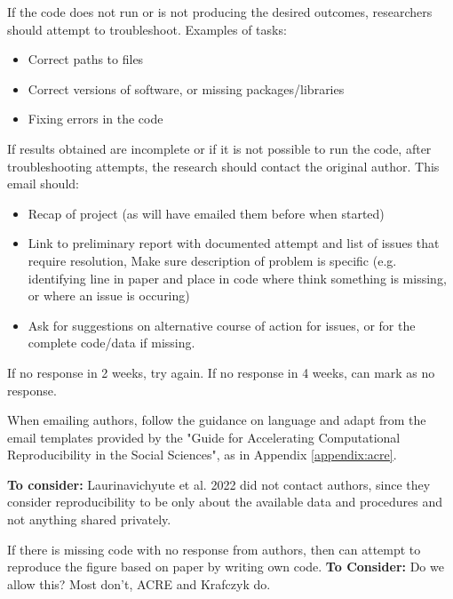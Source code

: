 If the code does not run or is not producing the desired outcomes, researchers should attempt to troubleshoot. Examples of tasks:
\begin{itemize}
    \item Correct paths to files
    \item Correct versions of software, or missing packages/libraries
    \item Fixing errors in the code
\end{itemize}

If results obtained are incomplete or if it is not possible to run the code, after troubleshooting attempts, the research should contact the original author. This email should:
\begin{itemize}
    \item Recap of project (as will have emailed them before when started)
    \item Link to preliminary report with documented attempt and list of issues that require resolution, Make sure description of problem is specific (e.g. identifying line in paper and place in code where think something is missing, or where an issue is occuring)
    \item Ask for suggestions on alternative course of action for issues, or for the complete code/data if missing.
\end{itemize}

If no response in 2 weeks, try again. If no response in 4 weeks, can mark as no response.

When emailing authors, follow the guidance on language and adapt from the email templates provided by the "Guide for Accelerating Computational Reproducibility in the Social Sciences",\autocite{berkeley_initiative_for_transparency_in_the_social_sciences_guide_2022} as in Appendix \ref{appendix:acre}.

\textbf{To consider:} Laurinavichyute et al. 2022 did not contact authors, since they consider reproducibility to be only about the available data and procedures and not anything shared privately.\autocite{laurinavichyute_share_2022}

If there is missing code with no response from authors, then can attempt to reproduce the figure based on paper by writing own code. \textbf{To Consider:} Do we allow this? Most don't, ACRE and Krafczyk do.

